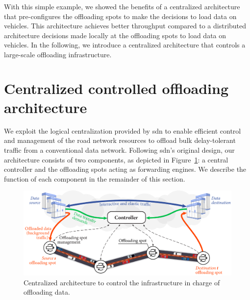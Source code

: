 With this simple example, we showed the benefits of a centralized architecture that pre-configures the offloading spots to make the decisions to load data on vehicles. This architecture achieves better throughput compared to a distributed architecture decisions made locally at the offloading spots to load data on vehicles. In the following, we introduce a centralized architecture that controls a large-scale offloading infrastructure.

\clearpage
\section{Centralized controlled offloading architecture}
\label{sec:offloading-system-operations}

We exploit the logical centralization provided by \acrfull{sdn} to enable efficient control and management of the road network resources to offload bulk delay-tolerant traffic from a conventional data network. Following \acrshort{sdn}'s original design, our architecture consists of two components, as depicted in Figure~\ref{fig:architecture}: a central controller and the offloading spots acting as forwarding engines. We describe the function of each component in the remainder of this section. 

\begin{figure}[h]
	\centering
	\includegraphics[width=0.85\columnwidth]{figures/architecture2.pdf}
	\caption{Centralized architecture to control the infrastructure in charge of offloading data.}
	\label{fig:architecture}
\end{figure}




